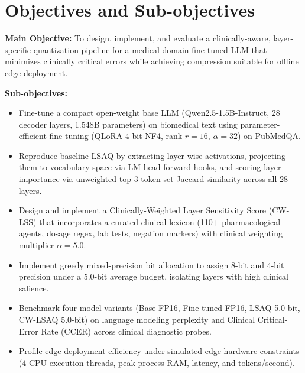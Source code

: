 \documentclass[conference]{IEEEtran}
\begin{document}
\section{Objectives and Sub-objectives}
\textbf{Main Objective:} To design, implement, and evaluate a clinically-aware, layer-specific quantization pipeline for a medical-domain fine-tuned LLM that minimizes clinically critical errors while achieving compression suitable for offline edge deployment.

\textbf{Sub-objectives:}
\begin{itemize}
    \item Fine-tune a compact open-weight base LLM (Qwen2.5-1.5B-Instruct, 28 decoder layers, 1.548B parameters) on biomedical text using parameter-efficient fine-tuning (QLoRA 4-bit NF4, rank $r=16$, $\alpha=32$) on PubMedQA.
    \item Reproduce baseline LSAQ by extracting layer-wise activations, projecting them to vocabulary space via LM-head forward hooks, and scoring layer importance via unweighted top-3 token-set Jaccard similarity across all 28 layers.
    \item Design and implement a Clinically-Weighted Layer Sensitivity Score (CW-LSS) that incorporates a curated clinical lexicon (110+ pharmacological agents, dosage regex, lab tests, negation markers) with clinical weighting multiplier $\alpha = 5.0$.
    \item Implement greedy mixed-precision bit allocation to assign 8-bit and 4-bit precision under a 5.0-bit average budget, isolating layers with high clinical salience.
    \item Benchmark four model variants (Base FP16, Fine-tuned FP16, LSAQ 5.0-bit, CW-LSAQ 5.0-bit) on language modeling perplexity and Clinical Critical-Error Rate (CCER) across clinical diagnostic probes.
    \item Profile edge-deployment efficiency under simulated edge hardware constraints (4 CPU execution threads, peak process RAM, latency, and tokens/second).
\end{itemize}

\end{document}
